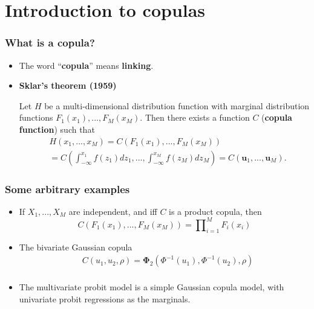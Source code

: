 \documentclass[14pt]{beamer}
\begin{document}
\section{Introduction to copulas}
\begin{frame}
  \frametitle{What is a copula?}
  \begin{itemize}
  \item The word ``\textbf{copula}'' means \textbf{linking}.
  \item \textbf{Sklar's theorem (1959)}

    Let $H$ be a multi-dimensional distribution function with marginal
    distribution functions $F_1(x_1),...,F_M(x_M)$. Then there exists a
    function $C$ (\textbf{copula function}) such that
    \begin{equation*}
      \begin{split}
        &H(x_1,...,x_M)=  C(F_1(x_1),...,F_M(x_M))\\
        &=C\left(\int_{-\infty}^{x_1}f(z_1)dz_1,...,\int_{-\infty}^{x_M}f(z_M)dz_M\right)=C(\bm{u}_1,...,\bm{u}_M).
      \end{split}
    \end{equation*}

  \end{itemize}
\end{frame}

\begin{frame}
  \frametitle{Some arbitrary examples}
  \begin{itemize}

  \item If $X_1,...,X_M$ are independent, and iff $C$ is a product copula, then
    \begin{equation*}
      C(F_1(x_1),...,F_M(x_M))=\prod \nolimits _{i=1}^{M} F_i(x_i)
    \end{equation*}

  \item The bivariate Gaussian copula
    \begin{equation*}
      \begin{split}
        &C(u_1,u_2,\rho)=\bm{\Phi}_2(\Phi^{-1}(u_1),\Phi^{-1}(u_2),\rho)\\
      \end{split}
    \end{equation*}

  \item The multivariate probit model is a simple Gaussian copula model,
    with univariate probit regressions as the marginals.
  \end{itemize}
\end{frame}
\end{document}
